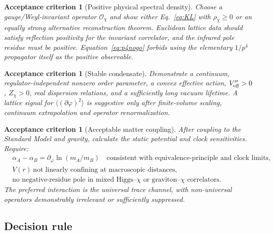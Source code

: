 \documentclass[11pt,a4paper]{article}
\newtheorem{criterion}[definition]{Acceptance criterion}
\begin{document}
\begin{criterion}[Positive physical spectral density]
Choose a gauge/Weyl-invariant operator $\mathcal O_\chi$ and show either Eq.~\eqref{eq:KL} with $\rho_\chi\ge0$ or an equally strong alternative reconstruction theorem. Euclidean lattice data should satisfy reflection positivity for the invariant correlator, and the infrared pole residue must be positive. Equation~\eqref{eq:p4nogo} forbids using the elementary $1/p^4$ propagator itself as the positive observable.
\end{criterion}

\begin{criterion}[Stable condensate]
Demonstrate a continuum, regulator-independent nonzero order parameter, a convex effective action, $V_{\rm eff}''>0$, $Z_\chi>0$, real dispersion relations, and a sufficiently long vacuum lifetime. A lattice signal for $\langle(\partial\varphi)^2\rangle$ is suggestive only after finite-volume scaling, continuum extrapolation and operator renormalization.
\end{criterion}

\begin{criterion}[Acceptable matter coupling]
After coupling to the Standard Model and gravity, calculate the static potential and clock sensitivities. Require:
\begin{align}
&\alpha_A-\alpha_B
=\partial_\varphi\ln(m_A/m_B)
\quad\text{consistent with equivalence-principle and clock limits},\\
&V(r)\ \text{not linearly confining at macroscopic distances},\\
&\text{no negative-residue pole in mixed Higgs--}\chi\text{ or graviton--}\chi\text{ correlators}.
\end{align}
The preferred interaction is the universal trace channel, with non-universal operators demonstrably irrelevant or sufficiently suppressed.
\end{criterion}

\subsection{Decision rule}
\end{document}
